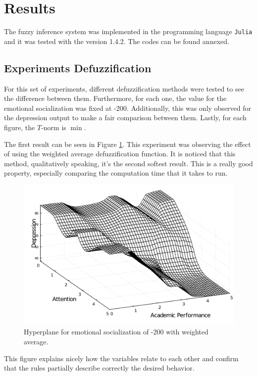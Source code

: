 \documentclass[conference]{IEEEtran}
\theoremstyle{definition}
\theoremstyle{remark}
\theoremstyle{remark}
\begin{document}
\section{Results}
The fuzzy inference system was implemented in the programming language
\texttt{Julia} and it was tested with the version 1.4.2. The codes can be found
annexed.

\subsection{Experiments Defuzzification}
For this set of experiments, different defuzzification methods were tested to
see the difference between them. Furthermore, for each one, the value for the
emotional socialization was fixed at -200. Additionally, this was only observed
for the depression output to make a fair comparison between them. Lastly, for
each figure, the $T$-norm is $\min$.

The first result can be seen in Figure \ref{fig:low_es}. This experiment was
observing the effect of using the weighted average defuzzification function. It
is noticed that this method, qualitatively speaking, it's the second softest
result. This is a really good property, especially comparing the computation
time that it takes to run.
\begin{figure}[t]
  \centering
  \includegraphics[scale=.3]{figs/low_es}
  \caption{Hyperplane for emotional socialization of -200 with weighted
    average.}
  \label{fig:low_es}
\end{figure}

This figure explains nicely how the variables relate to each other and confirm
that the rules partially describe correctly the desired behavior.
\end{document}

